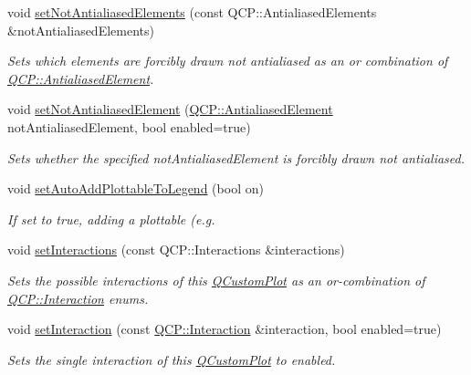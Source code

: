 \begin{DoxyCompactItemize}
void \hyperlink{classQCustomPlot_ae10d685b5eabea2999fb8775ca173c24}{set\+Not\+Antialiased\+Elements} (const Q\+C\+P\+::\+Antialiased\+Elements \&not\+Antialiased\+Elements)
\begin{DoxyCompactList}\small\item\em Sets which elements are forcibly drawn not antialiased as an {\itshape or} combination of \hyperlink{namespaceQCP_ae55dbe315d41fe80f29ba88100843a0c}{Q\+C\+P\+::\+Antialiased\+Element}. \end{DoxyCompactList}\item 
void \hyperlink{classQCustomPlot_afc657938a707c890e449ae89203a076d}{set\+Not\+Antialiased\+Element} (\hyperlink{namespaceQCP_ae55dbe315d41fe80f29ba88100843a0c}{Q\+C\+P\+::\+Antialiased\+Element} not\+Antialiased\+Element, bool enabled=true)
\begin{DoxyCompactList}\small\item\em Sets whether the specified {\itshape not\+Antialiased\+Element} is forcibly drawn not antialiased. \end{DoxyCompactList}\item 
void \hyperlink{classQCustomPlot_ad8858410c2db47b7104040a3aa61c3fc}{set\+Auto\+Add\+Plottable\+To\+Legend} (bool on)
\begin{DoxyCompactList}\small\item\em If set to true, adding a plottable (e.\+g. \end{DoxyCompactList}\item 
void \hyperlink{classQCustomPlot_a5ee1e2f6ae27419deca53e75907c27e5}{set\+Interactions} (const Q\+C\+P\+::\+Interactions \&interactions)
\begin{DoxyCompactList}\small\item\em Sets the possible interactions of this \hyperlink{classQCustomPlot}{Q\+Custom\+Plot} as an or-\/combination of \hyperlink{namespaceQCP_a2ad6bb6281c7c2d593d4277b44c2b037}{Q\+C\+P\+::\+Interaction} enums. \end{DoxyCompactList}\item 
void \hyperlink{classQCustomPlot_a422bf1bc6d56dac75a3d805d9a65902c}{set\+Interaction} (const \hyperlink{namespaceQCP_a2ad6bb6281c7c2d593d4277b44c2b037}{Q\+C\+P\+::\+Interaction} \&interaction, bool enabled=true)
\begin{DoxyCompactList}\small\item\em Sets the single {\itshape interaction} of this \hyperlink{classQCustomPlot}{Q\+Custom\+Plot} to {\itshape enabled}. \end{DoxyCompactList}\item 

\end{DoxyCompactItemize}
